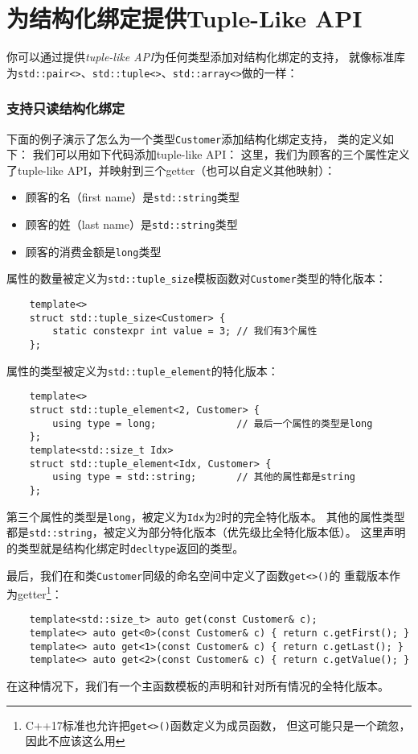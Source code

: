\section{为结构化绑定提供Tuple-Like API}
你可以通过提供\emph{tuple-like API}为任何类型添加对结构化绑定的支持，
就像标准库为\texttt{std::pair<>}、\texttt{std::tuple<>}、\texttt{std::array<>}做的一样：

\subsubsection{支持只读结构化绑定}
下面的例子演示了怎么为一个类型\texttt{Customer}添加结构化绑定支持，
类的定义如下：
我们可以用如下代码添加tuple-like API：
这里，我们为顾客的三个属性定义了tuple-like API，并映射到三个getter（也可以自定义其他映射）：
\begin{itemize}
    \item 顾客的名（first name）是\texttt{std::string}类型
    \item 顾客的姓（last name）是\texttt{std::string}类型
    \item 顾客的消费金额是\texttt{long}类型
\end{itemize}
属性的数量被定义为\texttt{std::tuple\_size}模板函数对\texttt{Customer}类型的特化版本：
\begin{lstlisting}
    template<>
    struct std::tuple_size<Customer> {
        static constexpr int value = 3; // 我们有3个属性
    };
\end{lstlisting}
属性的类型被定义为\texttt{std::tuple\_element}的特化版本：
\begin{lstlisting}
    template<>
    struct std::tuple_element<2, Customer> {
        using type = long;              // 最后一个属性的类型是long
    };
    template<std::size_t Idx>
    struct std::tuple_element<Idx, Customer> {
        using type = std::string;       // 其他的属性都是string
    };
\end{lstlisting}
第三个属性的类型是\texttt{long}，被定义为\texttt{Idx}为2时的完全特化版本。
其他的属性类型都是\texttt{std::string}，被定义为部分特化版本（优先级比全特化版本低）。
这里声明的类型就是结构化绑定时\texttt{decltype}返回的类型。

最后，我们在和类\texttt{Customer}同级的命名空间中定义了函数\texttt{get<>()}的
重载版本作为getter\footnote{C++17标准也允许把\texttt{get<>()}函数定义为成员函数，
但这可能只是一个疏忽，因此不应该这么用}：
\begin{lstlisting}
    template<std::size_t> auto get(const Customer& c);
    template<> auto get<0>(const Customer& c) { return c.getFirst(); }
    template<> auto get<1>(const Customer& c) { return c.getLast(); }
    template<> auto get<2>(const Customer& c) { return c.getValue(); }
\end{lstlisting}
在这种情况下，我们有一个主函数模板的声明和针对所有情况的全特化版本。

